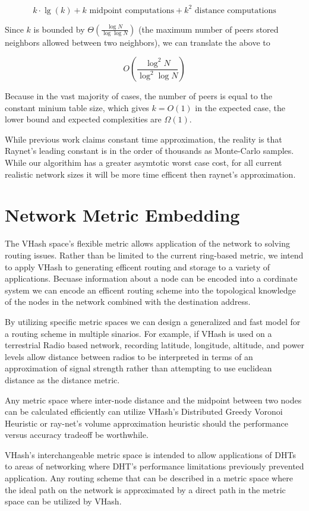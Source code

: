 \documentclass{IEEEtran}
\begin{document}
\[ k\cdot\lg(k) + k \text{ midpoint computations}  + k^{2} \text{ distance computations} \]


Since  $k$ is  bounded by $\Theta(\frac{\log N}{\log \log N} )$ \cite{bern1991expected} (the maximum number of peers stored neighbors allowed between two neighbors), we can translate the above to

\[O(\frac{\log^{2} N}{\log^{2} \log N} )\]

Because in the vast majority of cases, the number of peers is equal to the constant minium table size, which gives $k=O(1)$ in the expected case, the lower bound and expected complexities  are $\Omega{}(1)$.

While previous work \cite{raynet} claims constant time approximation, the reality is that Raynet's leading constant is in the order of thousands as Monte-Carlo samples.  
While our algorithim has a greater asymtotic worst case cost, for all current realistic network sizes it will be more time efficent then raynet's approximation.



\section{Network Metric Embedding}
The VHash space's flexible metric allows application of the network to solving routing issues.
Rather than be limited to the current ring-based metric, we intend to apply VHash to generating efficent routing and storage to a variety of applications.
Becuase information about a node can be encoded into a cordinate system we can encode an efficent routing scheme into the topological knowledge of the nodes in the network combined with the destination address.

By utilizing specific metric spaces we can design a generalized and fast model for a routing scheme in multiple sinarios.
For example, if VHash is used on a terrestrial Radio based network, recording latitude, longitude, altitude, and power levels allow distance between radios to be interpreted in terms of an approximation of signal strength rather than attempting to use euclidean distance as the distance metric.

Any metric space where inter-node distance and the midpoint between two nodes can be calculated efficiently can utilize VHash's Distributed Greedy Voronoi Heuristic or ray-net's volume approximation heuristic should the performance versus accuracy tradeoff be worthwhile.

VHash's interchangeable metric space is intended to allow applications of DHTs to areas of networking where DHT's performance limitations previously prevented application.
Any routing scheme that can be described in a metric space where the ideal path on the network is approximated by a direct path in the metric space can be utilized by VHash.
\end{document}
